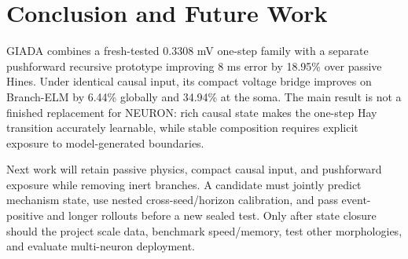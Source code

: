\documentclass[11pt]{article}
\begin{document}
\section{Conclusion and Future Work}

GIADA combines a fresh-tested 0.3308 mV one-step family with a separate
pushforward recursive prototype improving 8 ms error by 18.95\% over passive
Hines. Under identical causal input, its compact voltage bridge improves on
Branch-ELM by 6.44\% globally and 34.94\% at the soma. The main result is not a
finished replacement for NEURON: rich causal state makes the one-step Hay
transition accurately learnable, while stable composition requires explicit
exposure to model-generated boundaries.

Next work will retain passive physics, compact causal input, and pushforward
exposure while removing inert branches. A candidate must jointly predict
mechanism state, use nested cross-seed/horizon calibration, and pass
event-positive and longer rollouts before a new sealed test. Only after state
closure should the project scale data, benchmark speed/memory, test other
morphologies, and evaluate multi-neuron deployment.
\end{document}
